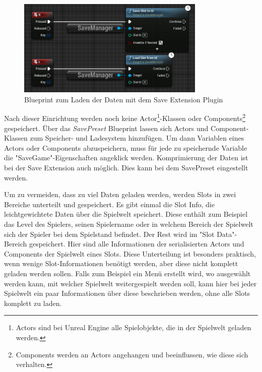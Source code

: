 \begin{figure}[htp]
    \centering
    \includegraphics[width=0.8\textwidth]{images/SaveExtension_load_save_blueprint.png}
    \caption{Blueprint zum Laden der Daten mit dem Save Extension Plugin\cite{piperiftPiperiftSaveBlueprint}}
    \label{fig:unrealSaveExtensionBlueprint}
\end{figure}

Nach dieser Einrichtung werden noch keine Actor\footnote{Actors sind bei Unreal Engine alle Spielobjekte, die in der Spielwelt geladen werden.\cite{unrealengineActors}}-Klassen oder Components\footnote{Components werden an Actors angehangen und beeinflussen, wie diese sich verhalten.\cite{unrealengineActors}} gespeichert. Über das \textit{SavePreset} Blueprint lassen sich Actors und Component-Klassen zum Speicher- und Ladesystem hinzufügen. Um dann Variablen eines Actors oder Components abzuspeichern, muss für jede zu speichernde Variable die "SaveGame"-Eigenschaften angeklick werden. Komprimierung der Daten ist bei der Save Extension auch möglich. Dies kann bei dem SavePreset eingestellt werden.

Um zu vermeiden, dass zu viel Daten geladen werden, werden Slots in zwei Bereiche unterteilt und gespeichert. Es gibt einmal die Slot Info, die leichtgewichtete Daten über die Spielwelt speichert. Diese enthält zum Beispiel das Level des Spielers, seinen Spielername oder in welchem Bereich der Spielwelt sich der Spieler bei dem Spielstand befindet. Der Rest wird im "Slot Data"-Bereich gespeichert. Hier sind alle Informationen der serialisierten Actors und Components der Spielwelt eines Slots. Diese Unterteilung ist besonders praktisch, wenn wenige Slot-Informationen benötigt werden, aber diese nicht komplett geladen werden sollen. Falls zum Beispiel ein Menü erstellt wird, wo ausgewählt werden kann, mit welcher Spielwelt weitergespielt werden soll, kann hier bei jeder Spielwelt ein paar Informationen über diese beschrieben werden, ohne alle Slots komplett zu laden.\cite{piperiftPiperiftSaveSlot}

